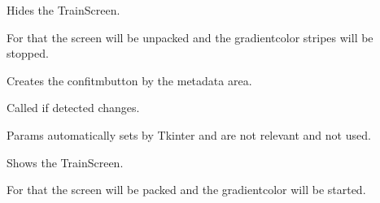 \documentclass[letterpaper,10pt,english]{sphinxmanual}
\begin{document}
\begin{fulllineitems}
\begin{fulllineitems}
\label{\detokenize{anoog.automation:anoog.automation.graphical_user_interface.Train_Window.hide}}
\sphinxAtStartPar
Hides the Train\sphinxhyphen{}Screen.

\sphinxAtStartPar
For that the screen will be unpacked and the gradient\sphinxhyphen{}color stripes will be stopped.

\end{fulllineitems}


\begin{fulllineitems}
\label{\detokenize{anoog.automation:anoog.automation.graphical_user_interface.Train_Window.init_changes}}
\sphinxAtStartPar
Creates the confitm\sphinxhyphen{}button by the meta\sphinxhyphen{}data area.

\sphinxAtStartPar
Called if detected changes.

\sphinxAtStartPar
Params automatically sets by Tkinter and are not relevant and not used.

\end{fulllineitems}


\begin{fulllineitems}
\label{\detokenize{anoog.automation:anoog.automation.graphical_user_interface.Train_Window.show}}
\sphinxAtStartPar
Shows the Train\sphinxhyphen{}Screen.

\sphinxAtStartPar
For that the screen will be packed and the gradient\sphinxhyphen{}color will be started.

\end{fulllineitems}



\end{fulllineitems}
\end{document}
